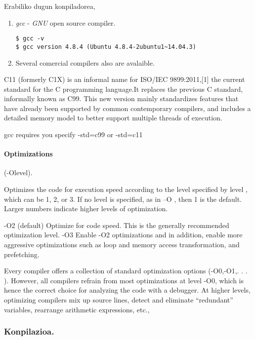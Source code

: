 Erabiliko dugun konpiladorea,

\begin{enumerate}

\item \emph{gcc} - \emph{GNU} open source compiler.

\begin{lstlisting}
$ gcc -v
$ gcc version 4.8.4 (Ubuntu 4.8.4-2ubuntu1~14.04.3) 
\end{lstlisting}

\item Several comercial compilers also are avalaible.

\end{enumerate}


C11 (formerly C1X) is an informal name for ISO/IEC 9899:2011,[1] the current standard for the C programming language.It replaces the previous C standard, informally known as C99. This new version mainly standardizes features that have already been supported by common contemporary compilers, and includes a detailed memory model to better support multiple threads of execution.

gcc requires you specify -std=c99 or -std=c11


\paragraph*{Optimizations} (-Olevel).
        
Optimizes the code for execution speed according to the level specified by level , which can be 1, 2, or 3. If no level is specified, as in –O , then 1 is the default. Larger numbers  indicate higher levels of optimization.

-O2 (default) Optimize for code speed. This is the generally recommended optimization level. -O3 Enable -O2 optimizations and in addition, enable more aggressive optimizations such as loop and memory access transformation, and prefetching. 

Every compiler offers a collection of standard optimization options (-O0,-O1,. . . ).  However, all compilers refrain from most optimizations at level -O0, which is hence the correct choice for analyzing the code with a debugger. At higher levels, optimizing compilers mix up source lines, detect and eliminate “redundant” variables, rearrange arithmetic expressions, etc.,      

\subsubsection*{Konpilazioa.}

